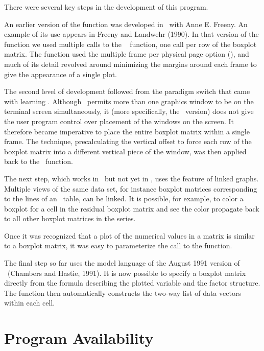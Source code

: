 There were several key steps in the development of this program.

An earlier version of the  function was developed in
\iS\ with Anne E.  Freeny.  An example of its use appears in
Freeny and Landwehr (1990).  In that version of the 
function we used multiple calls to the \iS\  function,
one call per row of the boxplot matrix.  The function used the
multiple frame per physical page option (),
and much of its detail revolved around minimizing the margins
around each frame to give the appearance of a single plot.

The second level of development followed from the paradigm switch
that came with learning \iX.  Although \iX\ permits more than one
graphics window to be on the terminal screen simultaneously, it
(more specifically, the \MSW\ version) does not give the
user program control over placement of the windows on the screen.
It therefore became imperative to place the entire boxplot matrix
within a single frame.	The technique, precalculating the
vertical offset to force each row of the boxplot matrix into a
different vertical piece of the window, was then applied back to
the \iS\ function.

The next step, which works in \iX\ but not yet in \iS, uses the
feature of linked graphs.  Multiple views of the same data set,
for instance boxplot matrices corresponding to the lines of an
\ANOVA\ table, can be linked.  It is possible, for example,
to color a boxplot for a cell in the residual boxplot matrix and
see the color propagate back to all other boxplot matrices in
the series.

Once it was recognized that a plot of the numerical values in a
matrix is similar to a boxplot matrix, it was easy to
parameterize the call to the  function.

The final step so far uses the model language of the August 1991 version of
\iS\ (Chambers and Hastie, 1991).  It is now possible to specify a boxplot
matrix directly from the formula describing the plotted variable and the factor
structure.  The  function then automatically constructs
the two-way list of data vectors within each cell.



\section{Program Availability} \label{sec-avail}

